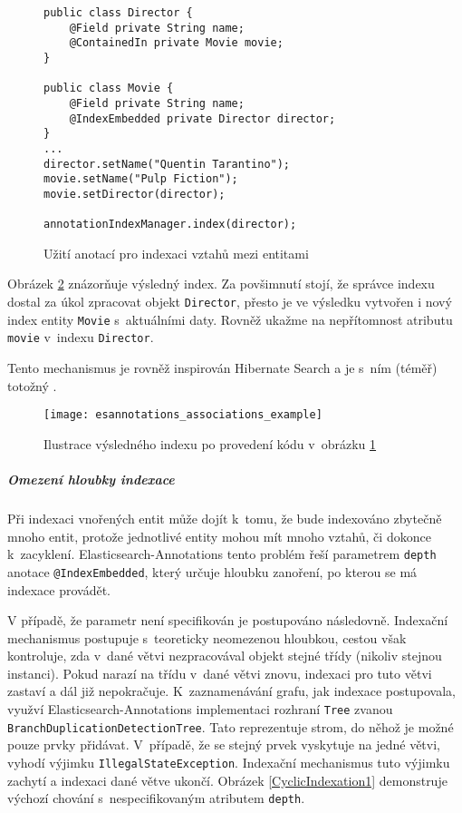 \documentclass[11pt,oneside]{fithesis2}
\begin{document}
\begin{figure}[!htbp]
\begin{lstlisting}[frame=single]
public class Director {
	@Field private String name;
	@ContainedIn private Movie movie;
}

public class Movie {
	@Field private String name;
	@IndexEmbedded private Director director;	
}
...
director.setName("Quentin Tarantino");
movie.setName("Pulp Fiction");
movie.setDirector(director);

annotationIndexManager.index(director);
\end{lstlisting}
\caption{Užití anotací pro indexaci vztahů mezi entitami}
\label{IndexingRelationsExample}
\end{figure}

Obrázek \ref{IndexingRelationsExampleResult} znázorňuje výsledný index. Za povšimnutí stojí, že správce indexu dostal za úkol zpracovat objekt \texttt{Director}, přesto je ve výsledku vytvořen i nový index entity \texttt{Movie} s~aktuálními daty. Rovněž ukažme na nepřítomnost atributu \texttt{movie} v~indexu \texttt{Director}. 

Tento mechanismus je rovněž inspirován Hibernate Search a je s~ním (téměř) totožný \cite[str. 110]{HibernateSearchAction}. 

\begin{figure}[h]
	\begin{center}
		\texttt{[image: esannotations\_associations\_example]}
	\end{center}
	\caption{Ilustrace výsledného indexu po provedení kódu v~obrázku \ref{IndexingRelationsExample}}	
	\label{IndexingRelationsExampleResult}
\end{figure}

\subparagraph{Omezení hloubky indexace} Při indexaci vnořených entit může dojít k~tomu, že bude indexováno zbytečně mnoho entit, protože jednotlivé entity mohou mít mnoho vztahů, či dokonce k~zacyklení. Elasticsearch-Annotations tento problém řeší parametrem \texttt{depth} anotace \texttt{@IndexEmbedded}, který určuje hloubku zanoření, po kterou se má indexace provádět. 

V případě, že parametr není specifikován je postupováno následovně. Indexační mechanismus postupuje s~teoreticky neomezenou hloubkou, cestou však kontroluje, zda v~dané větvi nezpracovával objekt stejné třídy (nikoliv stejnou instanci). Pokud narazí na třídu v~dané větvi znovu, indexaci pro tuto větvi zastaví a dál již nepokračuje. K~zaznamenávání grafu, jak indexace postupovala, využví Elasticsearch-Annotations implementaci rozhraní \texttt{Tree} zvanou \texttt{BranchDuplicationDetectionTree}. Tato reprezentuje strom, do něhož je možné pouze prvky přidávat. V~případě, že se stejný prvek vyskytuje na jedné větvi, vyhodí výjimku \texttt{IllegalStateException}. Indexační mechanismus tuto výjimku zachytí a indexaci dané větve ukončí. Obrázek \ref{CyclicIndexation1} demonstruje výchozí chování s~nespecifikovaným atributem \texttt{depth}. 
\end{document}
